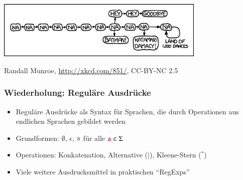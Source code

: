 \documentclass[onlymath]{beamer}
\author{\href{http://korrekt.org/}{Markus Kr\"{o}tzsch}\\Daniel Borchmann}
\begin{document}
\maketitle

\begin{frame}\frametitle{}

\includegraphics[width=10cm]{images/xkcd-na}

{\tiny Randall Munroe, \url{http://xkcd.com/851/}, CC-BY-NC 2.5}

\end{frame}



\begin{frame}\frametitle{Wiederholung: Reguläre Ausdrücke}

\begin{itemize}
\item Reguläre Ausdrücke als Syntax für Sprachen, die durch Operationen aus endlichen Sprachen gebildet werden
\item Grundformen: $\emptyset$, $\epsilon$, $\mathtt{\textcolor{purple}{a}}$ für alle $\mathtt{\textcolor{purple}{a}}\in\Sigma$
\item Operationen: Konkatenation, Alternative ($\mid$), Kleene-Stern (${}^*$)
\item Viele weitere Ausdrucksmittel in praktischen "`RegExps"'
\end{itemize}

\end{frame}
\end{document}
